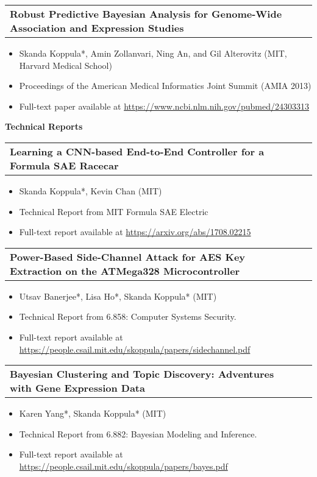 \documentclass[letterpaper,11pt]{article}
\makeatletter
\newcommand{\resitem}[1]{\item[--] #1 \vspace{-4pt}}
\newcommand{\ressubheadingtwo}[2] {
\begin{tabular*}{7in}{l@{\extracolsep{\fill}}r}
	\textbf{#1} & \textit{#2} \\
\end{tabular*}\vspace{-6pt}}
\makeatother
\begin{document}
\ressubheadingtwo{Robust Predictive Bayesian Analysis for Genome-Wide Association and Expression Studies}{}
\begin{itemize}
    \itemsep0em
    \resitem{Skanda Koppula*, Amin Zollanvari, Ning An, and Gil Alterovitz (MIT, Harvard Medical School)}
    \resitem{Proceedings of the American Medical Informatics Joint Summit (AMIA 2013)}
    \resitem{Full-text paper available at \url{https://www.ncbi.nlm.nih.gov/pubmed/24303313}}
\end{itemize}

\vspace{0.2in}

\large \textbf{Technical Reports\vspace{0.2in}}
\normalsize

\ressubheadingtwo{Learning a CNN-based End-to-End Controller for a Formula SAE Racecar}{}
\begin{itemize}
    \itemsep0em
    \resitem{Skanda Koppula*, Kevin Chan (MIT)}
    \resitem{Technical Report from MIT Formula SAE Electric}
    \resitem{Full-text report available at \url{https://arxiv.org/abs/1708.02215}}
\end{itemize}
\vspace{0.1in}

\ressubheadingtwo{Power-Based Side-Channel Attack for AES Key Extraction on the ATMega328 Microcontroller}{}
\begin{itemize}
    \itemsep0em
    \resitem{Utsav Banerjee*, Lisa Ho*, Skanda Koppula* (MIT)}
    \resitem{Technical Report from 6.858: Computer Systems Security.}
    \resitem{Full-text report available at \url{https://people.csail.mit.edu/skoppula/papers/sidechannel.pdf}}
\end{itemize}
\vspace{0.1in}

\ressubheadingtwo{Bayesian Clustering and Topic Discovery: Adventures with Gene Expression Data}{}
\begin{itemize}
    \itemsep0em
    \resitem{Karen Yang*, Skanda Koppula* (MIT)}
    \resitem{Technical Report from 6.882: Bayesian Modeling and Inference.}
    \resitem{Full-text report available at \url{https://people.csail.mit.edu/skoppula/papers/bayes.pdf}}
\end{itemize}
\vspace{0.1in}
\end{document}
